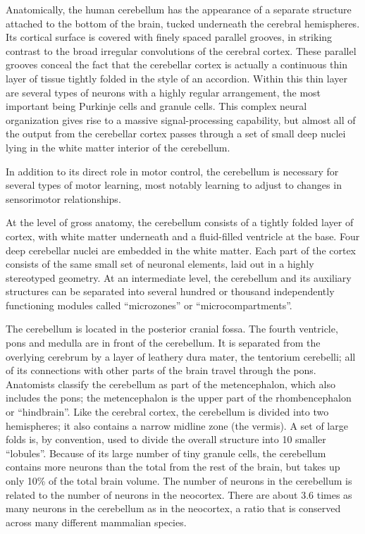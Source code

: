 Anatomically, the human cerebellum has the appearance of a separate structure attached to the bottom of the brain, tucked underneath the cerebral hemispheres. Its cortical surface is covered with finely spaced parallel grooves, in striking contrast to the broad irregular convolutions of the cerebral cortex. These parallel grooves conceal the fact that the cerebellar cortex is actually a continuous thin layer of tissue tightly folded in the style of an accordion. Within this thin layer are several types of neurons with a highly regular arrangement, the most important being Purkinje cells and granule cells. This complex neural organization gives rise to a massive signal-processing capability, but almost all of the output from the cerebellar cortex passes through a set of small deep nuclei lying in the white matter interior of the cerebellum.

In addition to its direct role in motor control, the cerebellum is necessary for several types of motor learning, most notably learning to adjust to changes in sensorimotor relationships.

At the level of gross anatomy, the cerebellum consists of a tightly folded layer of cortex, with white matter underneath and a fluid-filled ventricle at the base. Four deep cerebellar nuclei are embedded in the white matter. Each part of the cortex consists of the same small set of neuronal elements, laid out in a highly stereotyped geometry. At an intermediate level, the cerebellum and its auxiliary structures can be separated into several hundred or thousand independently functioning modules called ``microzones'' or ``microcompartments''.

The cerebellum is located in the posterior cranial fossa. The fourth ventricle, pons and medulla are in front of the cerebellum. It is separated from the overlying cerebrum by a layer of leathery dura mater, the tentorium cerebelli; all of its connections with other parts of the brain travel through the pons. Anatomists classify the cerebellum as part of the metencephalon, which also includes the pons; the metencephalon is the upper part of the rhombencephalon or ``hindbrain''. Like the cerebral cortex, the cerebellum is divided into two hemispheres; it also contains a narrow midline zone (the vermis). A set of large folds is, by convention, used to divide the overall structure into 10 smaller ``lobules''. Because of its large number of tiny granule cells, the cerebellum contains more neurons than the total from the rest of the brain, but takes up only 10\% of the total brain volume. The number of neurons in the cerebellum is related to the number of neurons in the neocortex. There are about 3.6 times as many neurons in the cerebellum as in the neocortex, a ratio that is conserved across many different mammalian species.

